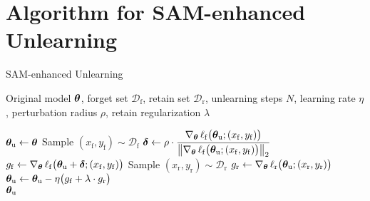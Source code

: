 \section{Algorithm for SAM-enhanced Unlearning}
\label{appendix: algorithm}

\begin{algorithm}[htb]
\caption{SAM-enhanced Unlearning}
\label{appendix: algo_sam}
\begin{algorithmic}[1]
\Require Original model ${\boldsymbol{\theta}}$, forget set $\mathcal{D}_{\mathrm{f}}$, retain set $\mathcal{D}_{\mathrm{r}}$, unlearning steps $N$, learning rate $\eta$, perturbation radius $\rho$, retain regularization $\lambda$

\State ${\boldsymbol{\theta}}_{\mathrm{u}} \gets {\boldsymbol{\theta}}$
    \State Sample $(x_{\mathrm{f}}, y_{\mathrm{f}}) \sim \mathcal{D}_{\mathrm{f}}$
    \State $\boldsymbol\delta \gets \rho \cdot \dfrac{\nabla_{{\boldsymbol{\theta}}} \,\ell_{\mathrm{f}}\bigl({\boldsymbol{\theta}}_{\mathrm{u}}; (x_{\mathrm{f}}, y_{\mathrm{f}})\bigr)}{\bigl\|\nabla_{{\boldsymbol{\theta}}} \,\ell_{\mathrm{f}}\bigl({\boldsymbol{\theta}}_{\mathrm{u}}; (x_{\mathrm{f}}, y_{\mathrm{f}})\bigr)\bigr\|_{2}}$
    \State $g_{\mathrm{f}} \gets \nabla_{{\boldsymbol{\theta}}} \,\ell_{\mathrm{f}}\bigl({\boldsymbol{\theta}}_{\mathrm{u}} + \boldsymbol\delta; (x_{\mathrm{f}}, y_{\mathrm{f}})\bigr)$
    \State Sample $(x_{\mathrm{r}}, y_{\mathrm{r}}) \sim \mathcal{D}_{\mathrm{r}}$
    \State $g_{\mathrm{r}} \gets \nabla_{{\boldsymbol{\theta}}} \,\ell_{\mathrm{r}}\bigl({\boldsymbol{\theta}}_{\mathrm{u}}; (x_{\mathrm{r}}, y_{\mathrm{r}})\bigr)$
    \State ${\boldsymbol{\theta}}_{\mathrm{u}} \gets {\boldsymbol{\theta}}_{\mathrm{u}} - \eta \bigl(g_{\mathrm{f}} + \lambda \cdot g_{\mathrm{r}}\bigr)$
\EndFor \\
\Return ${\boldsymbol{\theta}}_{\mathrm{u}}$
\end{algorithmic}
\end{algorithm}



